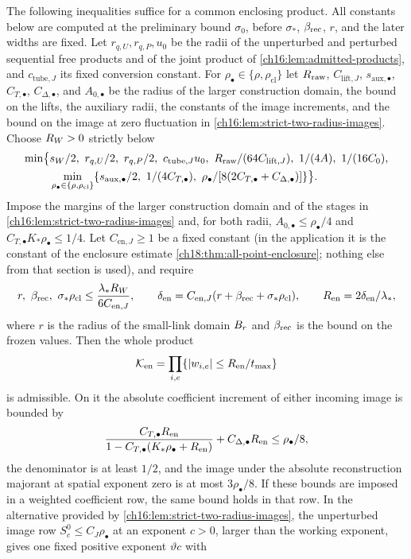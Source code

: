 \begin{lemma}
The following inequalities suffice for a common enclosing product. All constants below are computed at the preliminary bound $\sigma_0$, before $\sigma_*$, $\beta_{\mathrm{rec}}$, $r$, and the later widths are fixed. Let $r_{q,U},r_{q,P},u_0$ be the radii of the unperturbed and perturbed sequential free products and of the joint product of \cref{ch16:lem:admitted-products}, and $c_{\mathrm{tube},J}$ its fixed conversion constant. For $\rho_\bullet\in\{\rho,\rho_{\mathrm{cl}}\}$ let $R_{\mathrm{raw}}$, $C_{\mathrm{lift},J}$, $s_{\mathrm{aux},\bullet}$, $C_{T,\bullet}$, $C_{\Delta,\bullet}$, and $A_{0,\bullet}$ be the radius of the larger construction domain, the bound on the lifts, the auxiliary radii, the constants of the image increments, and the bound on the image at zero fluctuation in \cref{ch16:lem:strict-two-radius-images}. Choose $R_W>0$ strictly below
\[
\begin{split}
 \min\bigl\{&s_W/2,\ r_{q,U}/2,\ r_{q,P}/2,\ c_{\mathrm{tube},J}u_0,\ \Rraw/(64C_{\mathrm{lift},J}),\ 1/(4A),\ 1/(16C_0),\\
 &\min_{\rho_\bullet\in\{\rho,\rho_{\mathrm{cl}}\}}\{s_{\mathrm{aux},\bullet}/2,\ 1/(4C_{T,\bullet}),\ \rho_\bullet/[8(2C_{T,\bullet}+C_{\Delta,\bullet})]\}\bigr\}.
\end{split}
\]
Impose the margins of the larger construction domain and of the stages in \cref{ch16:lem:strict-two-radius-images} and, for both radii, $A_{0,\bullet}\le\rho_\bullet/4$ and $C_{T,\bullet}K_*\rho_\bullet\le1/4$. Let $C_{\mathrm{en},J}\ge1$ be a fixed constant (in the application it is the constant of the enclosure estimate \cref{ch18:thm:all-point-enclosure}; nothing else from that section is used), and require
\begin{equation}\label{ch17:eq:enclosure-budgets}
 r,\ \rrecord,\ \sigma_*\rho_{\mathrm{cl}}\le\frac{\lambda_*\Rwhite}{6C_{\mathrm{en},J}},\qquad
 \delta_{\mathrm{en}}=C_{\mathrm{en},J}(r+\rrecord+\sigma_*\rho_{\mathrm{cl}}),\qquad
 \Ren=2\delta_{\mathrm{en}}/\lambda_*,
\end{equation}
where $r$ is the radius of the small-link domain $B_{r}$ and $\beta_{\mathrm{rec}}$ is the bound on the frozen values. Then the whole product
\[
 \mathcal K_{\mathrm{en}}=\prod_{i,e}\{\lvert w_{i,e}\rvert\le R_{\mathrm{en}}/t_{\max}\}
\]
is admissible. On it the absolute coefficient increment of either incoming image is bounded by
\[
 \frac{C_{T,\bullet}R_{\mathrm{en}}}{1-C_{T,\bullet}(K_*\rho_\bullet+R_{\mathrm{en}})}+C_{\Delta,\bullet}R_{\mathrm{en}}\le\rho_\bullet/8,
\]
the denominator is at least $1/2$, and the image under the absolute reconstruction majorant at spatial exponent zero is at most $3\rho_\bullet/8$. If these bounds are imposed in a weighted coefficient row, the same bound holds in that row. In the alternative provided by \cref{ch16:lem:strict-two-radius-images}, the unperturbed image row $S_c^0\le C_J\rho_\bullet$ at an exponent $c>0$, larger than the working exponent, gives one fixed positive exponent $\vartheta c$ with

\end{lemma}
